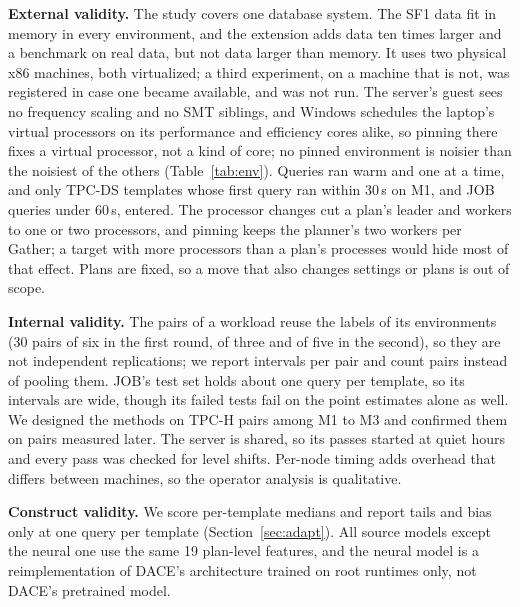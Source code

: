 \documentclass[conference]{IEEEtran}
\begin{document}
\textbf{External validity.} The study covers one database system. The SF1
data fit in memory in every environment, and the extension adds data ten
times larger and a benchmark on real data, but not data larger than memory.
It uses two physical x86 machines, both virtualized; a third experiment,
on a machine that is not, was registered in case one became available,
and was not run. The server's guest sees no frequency scaling and no SMT
siblings, and Windows schedules the laptop's virtual processors on its
performance and efficiency cores alike, so pinning there fixes a virtual
processor, not a kind of core; no pinned environment is noisier than the
noisiest of the others (Table~\ref{tab:env}). Queries ran warm and one at a time,
and only TPC-DS templates whose first query ran within 30\,s on M1, and
JOB queries under 60\,s, entered. The
processor changes cut a plan's leader and workers to one or two processors,
and pinning keeps the planner's two workers per Gather; a target with more
processors than a plan's processes would hide most of that effect. Plans
are fixed, so a move that also changes settings or plans is out of scope.

\textbf{Internal validity.} The pairs of a workload reuse the labels of its
environments (30 pairs of six in the first round, \XTpchTenPairs{} of
three and \XJobPairs{} of five in the second), so they are not independent
replications; we report intervals per pair and count pairs instead of
pooling them. JOB's test set holds about one query per template, so its
intervals are wide, though its failed tests fail on the point estimates
alone as well. We designed the
methods on TPC-H pairs among M1 to M3 and confirmed them on pairs measured
later. The server is shared, so its passes started at quiet hours and every
pass was checked for level shifts. Per-node timing adds overhead that
differs between machines, so the operator analysis is qualitative.

\textbf{Construct validity.} We score per-template medians and report
tails and bias only at one query per template
(Section~\ref{sec:adapt}). All source models except the neural one
use the same 19 plan-level features, and the neural model is a
reimplementation of DACE's architecture trained on root runtimes only, not
DACE's pretrained model.
\end{document}
